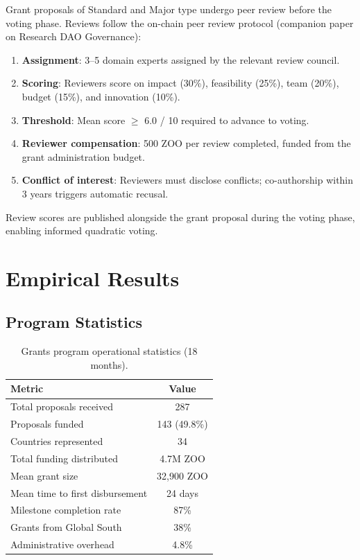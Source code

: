 \documentclass[11pt,letterpaper]{article}
\begin{document}
Grant proposals of Standard and Major type undergo peer review before the voting phase. Reviews follow the on-chain peer review protocol (companion paper on Research DAO Governance):

\begin{enumerate}
    \item \textbf{Assignment}: 3--5 domain experts assigned by the relevant review council.
    \item \textbf{Scoring}: Reviewers score on impact (30\%), feasibility (25\%), team (20\%), budget (15\%), and innovation (10\%).
    \item \textbf{Threshold}: Mean score $\geq$ 6.0 / 10 required to advance to voting.
    \item \textbf{Reviewer compensation}: 500 ZOO per review completed, funded from the grant administration budget.
    \item \textbf{Conflict of interest}: Reviewers must disclose conflicts; co-authorship within 3 years triggers automatic recusal.
\end{enumerate}

Review scores are published alongside the grant proposal during the voting phase, enabling informed quadratic voting.

\section{Empirical Results}
\label{sec:results}

\subsection{Program Statistics}

\begin{table}[h]
\centering
\caption{Grants program operational statistics (18 months).}
\label{tab:stats}
\begin{tabular}{lc}
\toprule
\textbf{Metric} & \textbf{Value} \\
\midrule
Total proposals received & 287 \\
Proposals funded & 143 (49.8\%) \\
Countries represented & 34 \\
Total funding distributed & 4.7M ZOO \\
Mean grant size & 32{,}900 ZOO \\
Mean time to first disbursement & 24 days \\
Milestone completion rate & 87\% \\
Grants from Global South & 38\% \\
Administrative overhead & 4.8\% \\
\bottomrule
\end{tabular}
\end{table}
\end{document}

